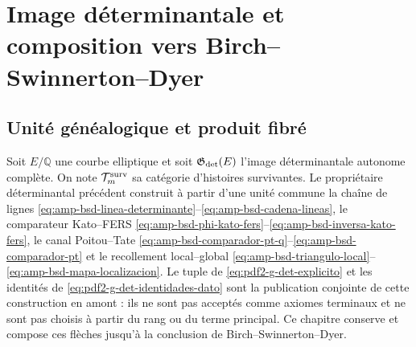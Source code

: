 \chapter{Image déterminantale et composition vers Birch--Swinnerton--Dyer}

\section{Unité généalogique et produit fibré}

Soit $E/\mathbb Q$ une courbe elliptique et soit
$\mathfrak G_{\rm det}(E)$ l'image déterminantale autonome complète. On
note $\mathcal T_m^{\rm surv}$ sa catégorie d'histoires
survivantes. Le propriétaire déterminantal précédent construit à partir d'une
unité commune la chaîne de lignes
\eqref{eq:amp-bsd-linea-determinante}--\eqref{eq:amp-bsd-cadena-lineas}, le
comparateur Kato--FERS
\eqref{eq:amp-bsd-phi-kato-fers}--\eqref{eq:amp-bsd-inversa-kato-fers}, le
canal Poitou--Tate
\eqref{eq:amp-bsd-comparador-pt-q}--\eqref{eq:amp-bsd-comparador-pt} et le
recollement local--global
\eqref{eq:amp-bsd-triangulo-local}--\eqref{eq:amp-bsd-mapa-localizacion}.
Le tuple de \eqref{eq:pdf2-g-det-explicito} et les identités de
\eqref{eq:pdf2-g-det-identidades-dato} sont la publication conjointe de cette
construction en amont : ils ne sont pas acceptés comme axiomes terminaux et ne sont pas choisis à
partir du rang ou du terme principal. Ce chapitre conserve et compose
ces flèches jusqu'à la conclusion de Birch--Swinnerton--Dyer.

